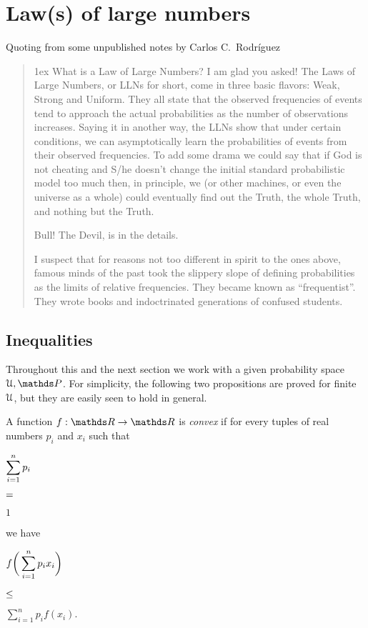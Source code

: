\documentclass[scombinatorics.tex]{subfiles}
\begin{document}
\chapter{Law(s) of large numbers}
\label{ulln}



\def\medrel#1{\parbox[t]{5ex}{$\displaystyle\hfil #1$}}
\def\ceq#1#2#3{\parbox[t]{20ex}{$\displaystyle #1$}\medrel{#2}{$\displaystyle #3$}}

Quoting from some unpublished notes by Carlos C.~Rodr\'iguez

\begin{quotation}\parindent0mm\parskip1ex\noindent
What is a Law of Large Numbers?
I am glad you asked! The Laws of Large Numbers, or LLNs for short, come in
three basic flavors: Weak, Strong and Uniform. They all state that the observed
frequencies of events tend to approach the actual probabilities as the number
of observations increases. Saying it in another way, the LLNs show that under
certain conditions, we can asymptotically learn the probabilities of events from
their observed frequencies. To add some drama we could say that if God is
not cheating and S/he doesn’t change the initial standard probabilistic model
too much then, in principle, we (or other machines, or even the universe as a
whole) could eventually find out the Truth, the whole Truth, and nothing but
the Truth.

Bull! The Devil, is in the details.

I suspect that for reasons not too different in spirit to the ones above, famous
minds of the past took the slippery slope of defining probabilities as the limits
of relative frequencies. They became known as ``frequentist''. They wrote
books and indoctrinated generations of confused students.
\end{quotation}
\section{Inequalities}

Throughout this and the next section we work with a given probability space $\U,\Pr$.
For simplicity, the following two propositions are proved for finite $\EuScript U$, but they are easily seen to hold in  general.

\begin{definition}A function $f:\RR\to\RR$ is \emph{convex\/} if for every tuples of real numbers $p_i$ and $x_i$ such that

\ceq{\hfill\sum^n_{i=1}p_i}
{=}
{1}

we have

\ceq{\hfill f\bigg(\sum^n_{i=1}p_ix_i\bigg)}
{\le}
{\sum^n_{i=1}p_if(x_i).}\QED
\end{definition}
\end{document}
